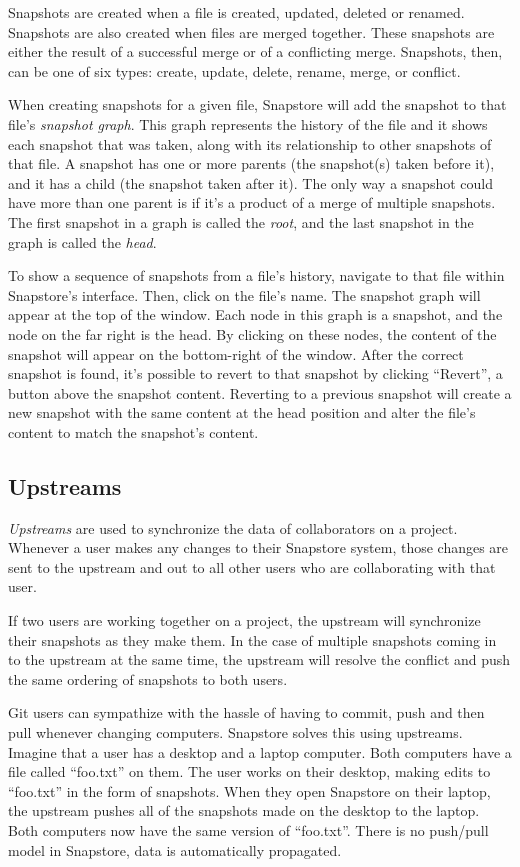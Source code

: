 Snapshots are created when a file is created, updated, deleted or renamed. Snapshots are also created when files are merged together. These snapshots are either the result of a successful merge or of a conflicting merge. Snapshots, then, can be one of six types: create, update, delete, rename, merge, or conflict.

When creating snapshots for a given file, Snapstore will add the snapshot to that file's \textit{snapshot graph}. This graph represents the history of the file and it shows each snapshot that was taken, along with its relationship to other snapshots of that file. A snapshot has one or more parents (the snapshot(s) taken before it), and it has a child (the snapshot taken after it). The only way a snapshot could have more than one parent is if it's a product of a merge of multiple snapshots. The first snapshot in a graph is called the \textit{root}, and the last snapshot in the graph is called the \textit{head}.

To show a sequence of snapshots from a file's history, navigate to that file within Snapstore's interface. Then, click on the file's name. The snapshot graph will appear at the top of the window. Each node in this graph is a snapshot, and the node on the far right is the head. By clicking on these nodes, the content of the snapshot will appear on the bottom-right of the window. After the correct snapshot is found, it's possible to revert to that snapshot by clicking ``Revert'', a button above the snapshot content. Reverting to a previous snapshot will create a new snapshot with the same content at the head position and alter the file's content to match the snapshot's content.

\subsection{Upstreams}

\textit{Upstreams} are used to synchronize the data of collaborators on a project. Whenever a user makes any changes to their Snapstore system, those changes are sent to the upstream and out to all other users who are collaborating with that user.

If two users are working together on a project, the upstream will synchronize their snapshots as they make them. In the case of multiple snapshots coming in to the upstream at the same time, the upstream will resolve the conflict and push the same ordering of snapshots to both users.

Git users can sympathize with the hassle of having to commit, push and then pull whenever changing computers. Snapstore solves this using upstreams. Imagine that a user has a desktop and a laptop computer. Both computers have a file called ``foo.txt'' on them. The user works on their desktop, making edits to ``foo.txt'' in the form of snapshots. When they open Snapstore on their laptop, the upstream pushes all of the snapshots made on the desktop to the laptop. Both computers now have the same version of ``foo.txt''. There is no push/pull model in Snapstore, data is automatically propagated.

